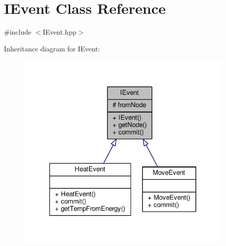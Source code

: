 \hypertarget{class_i_event}{\section{I\-Event Class Reference}
\label{class_i_event}
}


{\ttfamily \#include $<$I\-Event.\-hpp$>$}



Inheritance diagram for I\-Event\-:
\nopagebreak
\begin{figure}[H]
\begin{center}
\leavevmode
\includegraphics[width=301pt]{class_i_event__inherit__graph}
\end{center}
\end{figure}


